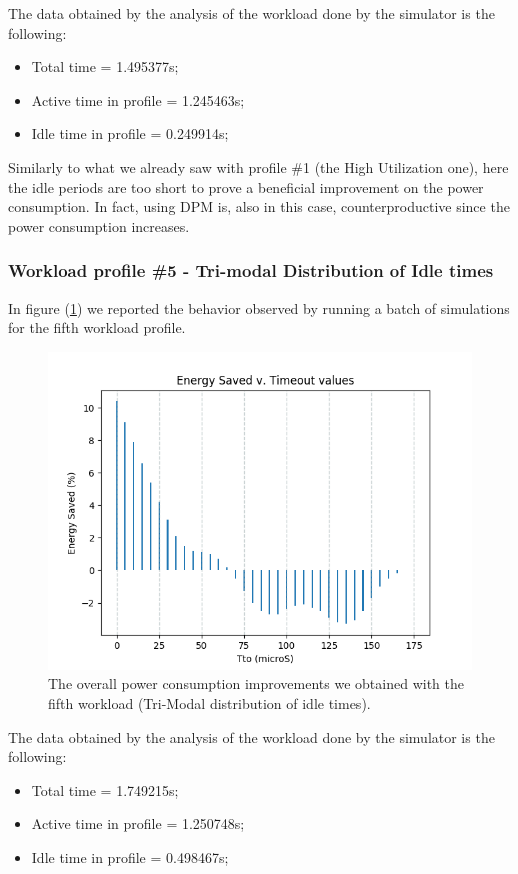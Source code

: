 \documentclass[a4paper]{article}
\begin{document}
            The data obtained by the analysis of the workload done by the simulator is the following:
            \begin{itemize}
                \item Total time = 1.495377s;
                \item Active time in profile = 1.245463s;
                \item Idle time in profile = 0.249914s;
            \end{itemize}

            Similarly to what we already saw with profile \#1 (the High Utilization one), here the idle periods are too short to prove a beneficial improvement on the power consumption. In fact, using DPM is, also in this case, counterproductive since the power consumption increases.

        \subsubsection{Workload profile \#5 - Tri-modal Distribution of Idle times}
            In figure (\ref{fig:Idle_case5}) we reported the behavior observed by running a batch of simulations for the fifth workload profile.

            \begin{figure}[htp]
                \centering
                \includegraphics[width=0.5 \columnwidth]{./screenshots/Idle_case5.png}
                \caption{
                        \label{fig:Idle_case5}
                        The overall power consumption improvements we obtained with the fifth workload (Tri-Modal distribution of idle times).
                }
            \end{figure}

            The data obtained by the analysis of the workload done by the simulator is the following:
            \begin{itemize}
                \item Total time = 1.749215s;
                \item Active time in profile = 1.250748s;
                \item Idle time in profile = 0.498467s;
            \end{itemize}
\end{document}
